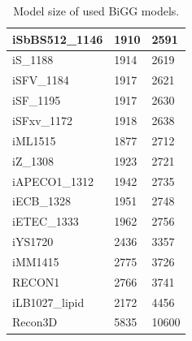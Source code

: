 \begin{table}[!ht]
\begin{tabular}{lll}
        iSbBS512\_1146 & 1910 & 2591 \\ \hline
        iS\_1188 & 1914 & 2619 \\ \hline
        iSFV\_1184 & 1917 & 2621 \\ \hline
        iSF\_1195 & 1917 & 2630 \\ \hline
        iSFxv\_1172 & 1918 & 2638 \\ \hline
        iML1515 & 1877 & 2712 \\ \hline
        iZ\_1308 & 1923 & 2721 \\ \hline
        iAPECO1\_1312 & 1942 & 2735 \\ \hline
        iECB\_1328 & 1951 & 2748 \\ \hline
        iETEC\_1333 & 1962 & 2756 \\ \hline
        iYS1720 & 2436 & 3357 \\ \hline
        iMM1415 & 2775 & 3726 \\ \hline
        RECON1 & 2766 & 3741 \\ \hline
        iLB1027\_lipid & 2172 & 4456 \\ \hline
        Recon3D & 5835 & 10600 \\ \hline
    \end{tabular}
    \caption{\label{Tab:big_model_size} Model size of used BiGG models.}
\end{table}

